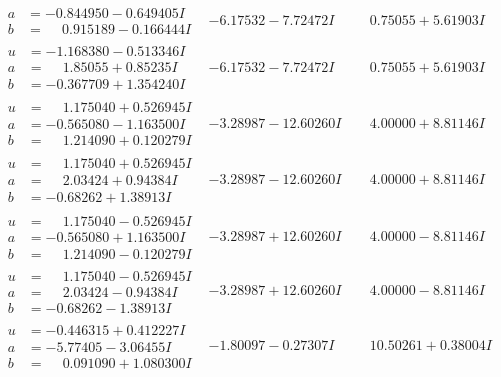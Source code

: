 \documentclass[1p]{elsarticle_modified}
\theoremstyle{definition}
\begin{document}
$$\begin{array}{c|c|c}
\begin{aligned}
a &= -0.844950 - 0.649405 I \\
b &= \phantom{-}0.915189 - 0.166444 I\end{aligned}
 & -6.17532 - 7.72472 I & \phantom{-}0.75055 + 5.61903 I \\ \hline\begin{aligned}
u &= -1.168380 - 0.513346 I \\
a &= \phantom{-}1.85055 + 0.85235 I \\
b &= -0.367709 + 1.354240 I\end{aligned}
 & -6.17532 - 7.72472 I & \phantom{-}0.75055 + 5.61903 I \\ \hline\begin{aligned}
u &= \phantom{-}1.175040 + 0.526945 I \\
a &= -0.565080 - 1.163500 I \\
b &= \phantom{-}1.214090 + 0.120279 I\end{aligned}
 & -3.28987 - 12.60260 I & \phantom{-}4.00000 + 8.81146 I \\ \hline\begin{aligned}
u &= \phantom{-}1.175040 + 0.526945 I \\
a &= \phantom{-}2.03424 + 0.94384 I \\
b &= -0.68262 + 1.38913 I\end{aligned}
 & -3.28987 - 12.60260 I & \phantom{-}4.00000 + 8.81146 I \\ \hline\begin{aligned}
u &= \phantom{-}1.175040 - 0.526945 I \\
a &= -0.565080 + 1.163500 I \\
b &= \phantom{-}1.214090 - 0.120279 I\end{aligned}
 & -3.28987 + 12.60260 I & \phantom{-}4.00000 - 8.81146 I \\ \hline\begin{aligned}
u &= \phantom{-}1.175040 - 0.526945 I \\
a &= \phantom{-}2.03424 - 0.94384 I \\
b &= -0.68262 - 1.38913 I\end{aligned}
 & -3.28987 + 12.60260 I & \phantom{-}4.00000 - 8.81146 I \\ \hline\begin{aligned}
u &= -0.446315 + 0.412227 I \\
a &= -5.77405 - 3.06455 I \\
b &= \phantom{-}0.091090 + 1.080300 I\end{aligned}
 & -1.80097 - 0.27307 I & \phantom{-}10.50261 + 0.38004 I \\ \hline\begin{aligned}

\end{aligned}
\end{array}$$
\end{document}
